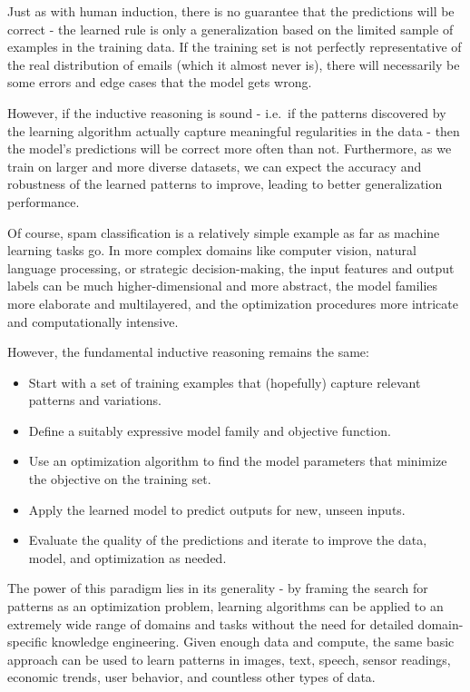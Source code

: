 \documentclass[
  9pt,
  letterpaper,
  abstract,
  titlepage]{scrbook}
\begin{document}
Just as with human induction, there is no guarantee that the predictions
will be correct - the learned rule is only a generalization based on the
limited sample of examples in the training data. If the training set is
not perfectly representative of the real distribution of emails (which
it almost never is), there will necessarily be some errors and edge
cases that the model gets wrong.

However, if the inductive reasoning is sound - i.e.~if the patterns
discovered by the learning algorithm actually capture meaningful
regularities in the data - then the model's predictions will be correct
more often than not. Furthermore, as we train on larger and more diverse
datasets, we can expect the accuracy and robustness of the learned
patterns to improve, leading to better generalization performance.

Of course, spam classification is a relatively simple example as far as
machine learning tasks go. In more complex domains like computer vision,
natural language processing, or strategic decision-making, the input
features and output labels can be much higher-dimensional and more
abstract, the model families more elaborate and multilayered, and the
optimization procedures more intricate and computationally intensive.

However, the fundamental inductive reasoning remains the same:

\begin{itemize}
\item
  Start with a set of training examples that (hopefully) capture
  relevant patterns and variations.
\item
  Define a suitably expressive model family and objective function.
\item
  Use an optimization algorithm to find the model parameters that
  minimize the objective on the training set.
\item
  Apply the learned model to predict outputs for new, unseen inputs.
\item
  Evaluate the quality of the predictions and iterate to improve the
  data, model, and optimization as needed.
\end{itemize}

The power of this paradigm lies in its generality - by framing the
search for patterns as an optimization problem, learning algorithms can
be applied to an extremely wide range of domains and tasks without the
need for detailed domain-specific knowledge engineering. Given enough
data and compute, the same basic approach can be used to learn patterns
in images, text, speech, sensor readings, economic trends, user
behavior, and countless other types of data.
\end{document}
